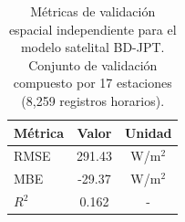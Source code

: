 \begin{table}[htpb]
\centering
\caption{Métricas de validación espacial independiente para el modelo satelital BD-JPT. Conjunto de validación compuesto por 17 estaciones (8,259 registros horarios).}
\label{tab:bdjpt_validation}
\begin{tabular}{lcc}
\hline
\textbf{Métrica} & \textbf{Valor} & \textbf{Unidad} \\
\hline
RMSE & 291.43 & W/m$^2$ \\
MBE & -29.37 & W/m$^2$ \\
$R^2$ & 0.162 & - \\
\hline
\end{tabular}
\end{table}